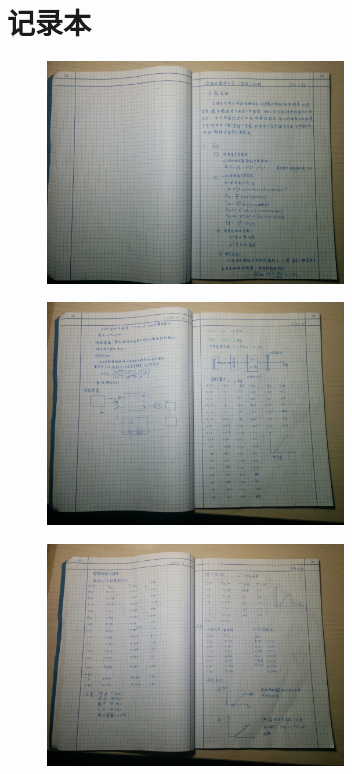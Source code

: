 \documentclass[aps,pre,12pt,preprint,onecolumn,showpacs,showkeys,UTF8]{revtex4-1}
\begin{document}
\clearpage
\appendix
\section{记录本}
\begin{figure}[h]
	\begin{center}
		\includegraphics[width=0.7\textwidth]{pic8.jpg}
	\end{center}
\end{figure}
\begin{figure}[h]
	\begin{center}
		\includegraphics[width=0.7\textwidth]{pic9.jpg}
	\end{center}
\end{figure}
\begin{figure}[h]
	\begin{center}
		\includegraphics[width=0.7\textwidth]{pic10.jpg}
	\end{center}
\end{figure}
\end{document}

